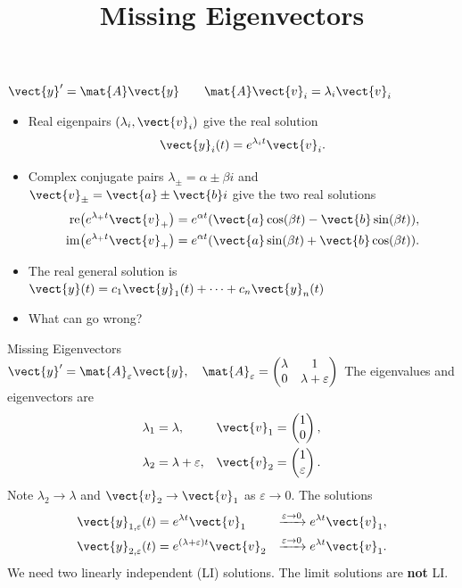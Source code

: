 \documentclass[11pt,aspectratio=169]{beamer}
\title{Missing Eigenvectors}
\date{}
\begin{document}
\begin{frame}{\(\vect{y}'=\mat{A}\vect{y}\qquad \mat{A}\vect{v}_i=\lambda_i\vect{v}_i\)}
\begin{itemize}
\item Real eigenpairs \((\lambda_i,\vect{v}_i)\) give the real solution
\[
\vect{y}_i(t)=e^{\lambda_i t}\vect{v}_i.
\]
\item Complex conjugate pairs 
\(\lambda_\pm=\alpha\pm\beta i\) and
\(\vect{v}_\pm=\vect{a}\pm\vect{b}i\)
give the two real solutions
\[
\begin{aligned}
\operatorname{re}\!\left(e^{\lambda_+t}\vect{v}_+\right)
&=e^{\alpha t}(\vect{a}\cos(\beta t)-\vect{b}\sin(\beta t)),\\
\operatorname{im}\!\left(e^{\lambda_+t}\vect{v}_+\right)
&=e^{\alpha t}(\vect{a}\sin(\beta t)+\vect{b}\cos(\beta t)).
\end{aligned}
\]
\item The real general solution is
\(\vect{y}(t)=c_1\vect{y}_1(t)+\cdots+c_n\vect{y}_n(t)\)
\item What can go wrong?
\end{itemize}
\end{frame}


\begin{frame}{Missing Eigenvectors \quad \(\vect{y}'=\mat{A}_{\varepsilon}\vect{y},\quad
\mat{A}_{\varepsilon}=\begin{pmatrix}\lambda&1\\0&\lambda+\varepsilon\end{pmatrix}\)}
The eigenvalues and eigenvectors are
\[
\begin{aligned}
\lambda_1&=\lambda,
&\vect{v}_1&=\begin{pmatrix}1\\0\end{pmatrix},\\
\lambda_2&=\lambda+\varepsilon,
&\vect{v}_2&=\begin{pmatrix}1\\\varepsilon\end{pmatrix}.
\end{aligned}
\]
Note \(\lambda_2\to\lambda\) and \(\vect{v}_2\to\vect{v}_1\) as
\(\varepsilon\to0\). The solutions
\[
\begin{aligned}
\vect{y}_{1,\varepsilon}(t)&=e^{\lambda t}\vect{v}_1
&\xrightarrow{\varepsilon\to0}&\;e^{\lambda t}\vect{v}_1,\\
\vect{y}_{2,\varepsilon}(t)&=e^{(\lambda+\varepsilon)t}\vect{v}_2
&\xrightarrow{\varepsilon\to0}&\;e^{\lambda t}\vect{v}_1.
\end{aligned}
\]
We need two linearly independent (LI) solutions. The limit solutions are \textbf{not} LI.
\end{frame}
\end{document}
